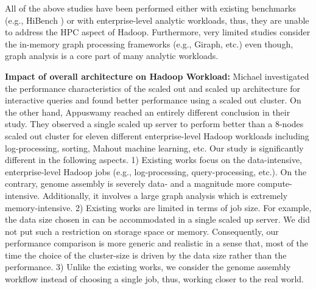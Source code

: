 \documentclass[conference]{IEEEtran}
\begin{document}
All of the above studies have been performed either with existing benchmarks (e.g., HiBench \cite{bm:hibench}) or with enterprise-level analytic workloads, thus, they are unable to address the HPC aspect of Hadoop. 
Furthermore, very limited studies consider the in-memory graph processing frameworks (e.g., Giraph, etc.) even though, graph analysis is a core part of many analytic workloads. 

\textbf{Impact of overall architecture on Hadoop Workload:}
Michael \cite{scaleupscaleout:michael} investigated the performance characteristics of the scaled out and scaled up architecture for interactive queries and found better performance using a scaled out cluster. 
On the other hand, Appuswamy \cite{scaleupscaleout:appuswamy} reached an entirely different conclusion in their study. 
They observed a single scaled up server to perform better than a 8-nodes scaled out cluster for eleven different enterprise-level Hadoop workloads including log-processing, sorting, Mahout machine learning, etc. 
Our study is significantly different in the following aspects. 
1) Existing works focus on the data-intensive, enterprise-level Hadoop jobs (e.g., log-processing, query-processing, etc.). On the contrary, genome assembly is severely data- and a magnitude more compute-intensive. Additionally, it involves a large graph analysis which is extremely memory-intensive. 
2) Existing works are limited in terms of job size. For example, the data size chosen in \cite{scaleupscaleout:appuswamy} can be accommodated in a single scaled up server. We did not put such a restriction on storage space or memory. Consequently, our performance comparison is more generic and realistic in a sense that, most of the time the choice of the cluster-size is driven by the data size rather than the performance. 
3) Unlike the existing works, we consider the genome assembly workflow instead of choosing a single job, thus, working closer to the real world. 


\end{document}
